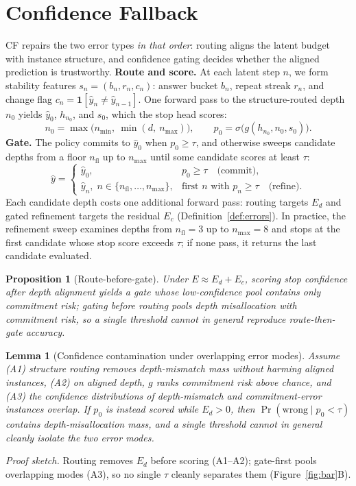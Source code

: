 \documentclass{article}
\theoremstyle{compactthm}
\newtheorem{proposition}{Proposition}
\newtheorem{lemma}{Lemma}
\theoremstyle{compactdef}
\begin{document}
\section{Confidence Fallback}
\label{sec:method}
CF repairs the two error types \emph{in that order}: routing aligns the latent budget with instance structure, and confidence gating decides whether the aligned prediction is trustworthy. \textbf{Route and score.} At each latent step $n$, we form stability features $s_n=(b_n,r_n,c_n)$: answer bucket $b_n$, repeat streak $r_n$, and change flag $c_n=\mathbf{1}[\hat y_n\ne\hat y_{n-1}]$. One forward pass to the structure-routed depth $n_0$ yields $\hat y_0$, $h_{n_0}$, and $s_0$, which the stop head scores:
\begin{equation}
\label{eq:route}
n_0 = \max\big(n_{\min},\ \min(d,\ n_{\max})\big), \qquad p_0 = \sigma\big(g(h_{n_0}, n_0, s_0)\big).
\end{equation}
\textbf{Gate.} The policy commits to $\hat y_0$ when $p_0 \ge \tau$, and otherwise sweeps candidate depths from a floor $n_{\mathrm{fl}}$ up to $n_{\max}$ until some candidate scores at least $\tau$:
\begin{equation}
\label{eq:policy}
\hat y = \begin{cases} \hat y_0, & p_0 \ge \tau \quad \text{(commit)},\\[1pt] \hat y_{n},\; n \in \{n_{\mathrm{fl}}, \ldots, n_{\max}\}, & \text{first $n$ with } p_n \ge \tau \quad \text{(refine)}. \end{cases}
\end{equation}
Each candidate depth costs one additional forward pass: routing targets $E_d$ and gated refinement targets the residual $E_c$ (Definition~\ref{def:errors}). In practice, the refinement sweep examines depths from $n_{\mathrm{fl}}{=}3$ up to $n_{\max}{=}8$ and stops at the first candidate whose stop score exceeds $\tau$; if none pass, it returns the last candidate evaluated.

\begin{proposition}[Route-before-gate]
\label{prop:order}
Under $E\approx E_d+E_c$, scoring stop confidence after depth alignment yields a gate whose low-confidence pool contains only commitment risk; gating before routing pools depth misallocation with commitment risk, so a single threshold cannot in general reproduce route-then-gate accuracy.
\end{proposition}

\begin{lemma}[Confidence contamination under overlapping error modes]
\label{lem:contam}
Assume \emph{(A1)} structure routing removes depth-mismatch mass without harming aligned instances, \emph{(A2)} on aligned depth, $g$ ranks commitment risk above chance, and \emph{(A3)} the confidence distributions of depth-mismatch and commitment-error instances overlap. If $p_0$ is instead scored while $E_d>0$, then $\Pr(\mathrm{wrong}\mid p_0<\tau)$ contains depth-misallocation mass, and a single threshold cannot in general cleanly isolate the two error modes.
\end{lemma}
\textit{Proof sketch.} Routing removes $E_d$ before scoring (A1--A2); gate-first pools overlapping modes (A3), so no single $\tau$ cleanly separates them (Figure~\ref{fig:bar}B).
\end{document}

